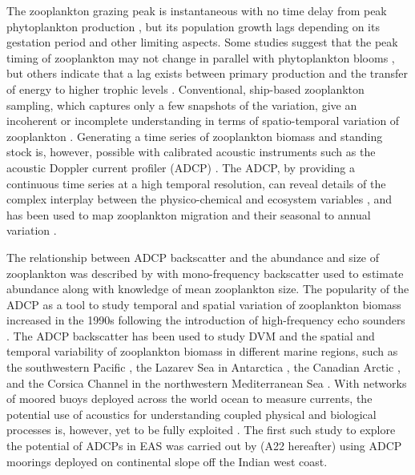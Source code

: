 \documentclass[authoryear,review,11pt]{elsarticle}
\begin{document}
The zooplankton grazing peak is instantaneous with no time delay from peak phytoplankton production \citep{li2000determines,barber2001qn}, but its population growth lags \citep{rehim2012dynamical, almen2020temperature} depending on its gestation period and other limiting aspects. Some studies suggest that the peak timing of zooplankton may not change in parallel with phytoplankton blooms \citep{winder2004climatic}, but others indicate that a lag exists between primary production and the transfer of energy to higher trophic levels \citep{brock1992interannual, brock1991phytoplankton}. Conventional, ship-based zooplankton sampling, which captures only a few snapshots of the variation, give an incoherent or incomplete understanding in terms of spatio-temporal variation of zooplankton \citep{ramamurthy1965studies, madhupratap1992zooplankton, piontkovski1995spatial, madhupratap1996lack, wishner1998mesozooplankton,nair1999arabian, barber2001qn, jyothibabu2010re, khandagale2022seasonal}. Generating a time series of zooplankton biomass and standing stock is, however, possible with calibrated acoustic instruments such as the acoustic Doppler current profiler (ADCP) \citep{edvardsen2003assessing, smith2005mesozooplankton, smeti2015spatial, kang2024acoustic}.  The ADCP, by providing a continuous time series at a high temporal resolution, can reveal details of the complex interplay between the physico-chemical and ecosystem variables \citep{jiang2007temporal, potiris2018acoustic, shankar2019role, aparna2022seasonal, nie2023influence}, and has been used to map zooplankton migration \citep{inoue2016diel,ursella2018evidence, ursella2021diel} and their seasonal to annual variation \citep{jiang2007temporal,  hobbs2021marine, liu2022seasonal, aparna2022seasonal}.

The relationship between ADCP backscatter and the abundance and size of zooplankton was described by \citet{greenlaw1979acoustical} with mono-frequency backscatter used to estimate abundance along with knowledge of mean zooplankton size. The popularity of the ADCP as a tool to study temporal and spatial variation of zooplankton biomass increased in the 1990s following the introduction of high-frequency echo sounders \citep{flagg1989use, wiebe1990sound, batchelder00981, greene1998three, rippeth1998diur}. The ADCP backscatter has been used to study DVM and the spatial and temporal variability of zooplankton biomass in different marine regions, such as the southwestern Pacific  \citep{smeti2015spatial}, the Lazarev Sea in Antarctica  \citep{cisewski2010seasonal}, the Canadian Arctic  \citep{hamilton2013links}, and the Corsica Channel in the northwestern Mediterranean Sea \citep{guerra2019zooplankton}. With networks of moored buoys deployed across the world ocean to measure currents, the potential use of acoustics for understanding coupled physical and biological processes is, however, yet to be fully exploited \citep{davis2019100}. The first such study to explore the potential of ADCPs in EAS was carried out by \citet{aparna2022seasonal} (A22 hereafter) using ADCP moorings deployed on continental slope off the Indian west coast. 
\end{document}
